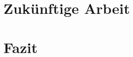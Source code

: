 \documentclass[a4paper,titlepage,onecolumn,twoside,12pt]{article}
\begin{document}
\section{Zukünftige Arbeit}
\label{sec:zukünftige}
\section{Fazit}
\label{sec:fazit}

%
%

\cleardoublepage
\newpage\thispagestyle{plain}
{}
{}
\nocite{*}

%
\end{document}
